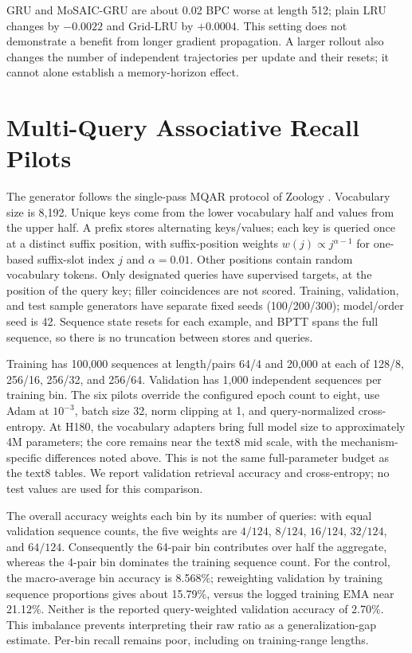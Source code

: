 \documentclass[letterpaper,twoside]{article}
\begin{document}


GRU and MoSAIC-GRU are about 0.02 BPC worse at length 512; plain LRU changes by $-0.0022$ and Grid-LRU by $+0.0004$. This setting does not demonstrate a benefit from longer gradient propagation. A larger rollout also changes the number of independent trajectories per update and their resets; it cannot alone establish a memory-horizon effect.

\section{Multi-Query Associative Recall Pilots}\label{app:mqar}

The generator follows the single-pass MQAR protocol of Zoology \citep{arora2023zoology}. Vocabulary size is 8,192. Unique keys come from the lower vocabulary half and values from the upper half. A prefix stores alternating keys/values; each key is queried once at a distinct suffix position, with suffix-position weights $w(j)\propto j^{\alpha-1}$ for one-based suffix-slot index $j$ and $\alpha=0.01$. Other positions contain random vocabulary tokens. Only designated queries have supervised targets, at the position of the query key; filler coincidences are not scored. Training, validation, and test sample generators have separate fixed seeds (100/200/300); model/order seed is 42. Sequence state resets for each example, and BPTT spans the full sequence, so there is no truncation between stores and queries.

Training has 100,000 sequences at length/pairs 64/4 and 20,000 at each of 128/8, 256/16, 256/32, and 256/64. Validation has 1,000 independent sequences per training bin. The six pilots override the configured epoch count to eight, use Adam \citep{kingma2015adam} at $10^{-3}$, batch size 32, norm clipping at 1, and query-normalized cross-entropy. At H180, the vocabulary adapters bring full model size to approximately 4M parameters; the core remains near the text8 mid scale, with the mechanism-specific differences noted above. This is not the same full-parameter budget as the text8 tables. We report validation retrieval accuracy and cross-entropy; no test values are used for this comparison.



The overall accuracy weights each bin by its number of queries: with equal validation sequence counts, the five weights are $4/124$, $8/124$, $16/124$, $32/124$, and $64/124$. Consequently the 64-pair bin contributes over half the aggregate, whereas the 4-pair bin dominates the training sequence count. For the control, the macro-average bin accuracy is 8.568\%; reweighting validation by training sequence proportions gives about 15.79\%, versus the logged training EMA near 21.12\%. Neither is the reported query-weighted validation accuracy of 2.70\%. This imbalance prevents interpreting their raw ratio as a generalization-gap estimate. Per-bin recall remains poor, including on training-range lengths.
\end{document}
